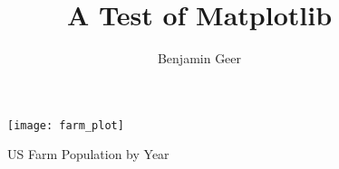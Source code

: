 \documentclass[a4paper]{article}
\title{A Test of Matplotlib}
\author{Benjamin Geer}
\begin{document}
\maketitle

\begin{figure}[h]
\begin{center}
\texttt{[image: farm\_plot]}
\caption{US Farm Population by Year}
\end{center}
\label{fig:farm}
\end{figure}
\end{document}

